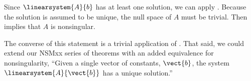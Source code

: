Since $\linearsystem{A}{b}$ has at least one solution, we can apply .  Because the solution is assumed to be unique, the null space of $A$ must be trivial.  Then  implies that $A$ is nonsingular.\par
%
The converse of this statement is a trivial application of .  That said, we could extend our NSMxx series of theorems with an added equivalence for nonsingularity, ``Given a single vector of constants, $\vect{b}$, the system $\linearsystem{A}{\vect{b}}$ has a unique solution.''